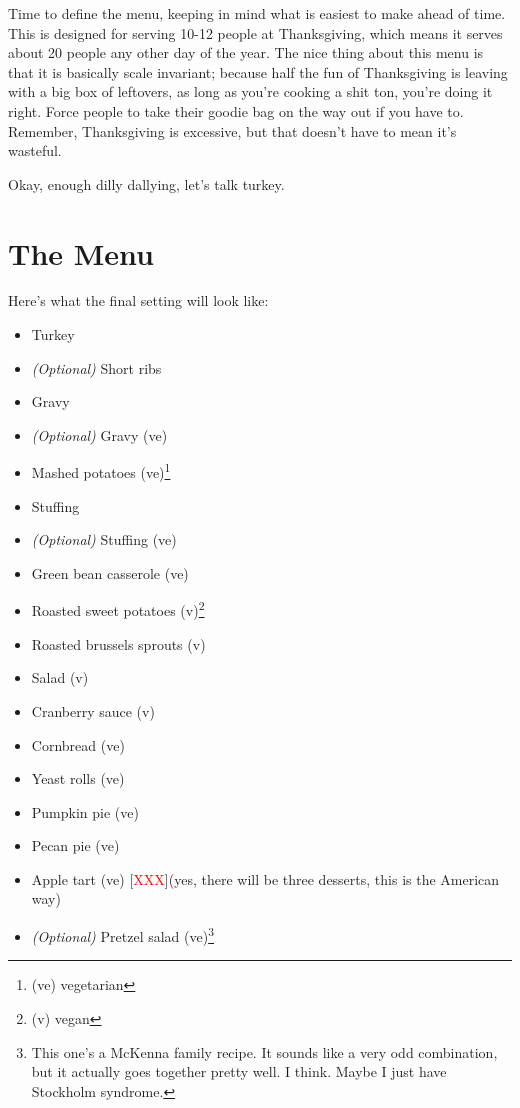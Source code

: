 \documentclass[12pt]{article}
\newcommand{\TODO}{[\textcolor{red}{XXX}]}
\begin{document}
	Time to define the menu, keeping in mind what is easiest to make ahead of time. This is designed for serving 10-12 people at Thanksgiving, which means it serves about 20 people any other day of the year. The nice thing about this menu is that it is basically scale invariant; because half the fun of Thanksgiving is leaving with a big box of leftovers, as long as you're cooking a shit ton, you're doing it right. Force people to take their goodie bag on the way out if you have to. Remember, Thanksgiving is excessive, but that doesn't have to mean it's wasteful.
	
	Okay, enough dilly dallying, let's talk turkey.
	
	\newpage
	
	\section{The Menu}
	Here's what the final setting will look like:
	\begin{itemize}
		\item Turkey
		\item \textit{(Optional)} Short ribs
		\item Gravy
		\item \textit{(Optional)} Gravy (ve)
		\item Mashed potatoes (ve)\footnote{(ve) vegetarian}
		\item Stuffing
		\item \textit{(Optional)} Stuffing (ve)
		\item Green bean casserole (ve)
		\item Roasted sweet potatoes (v)\footnote{(v) vegan}
		\item Roasted brussels sprouts (v)
		\item Salad (v)
		\item Cranberry sauce (v)
		\item Cornbread (ve)
		\item Yeast rolls (ve)
		\item Pumpkin pie (ve)
		\item Pecan pie (ve)
		\item Apple tart (ve) \TODO (yes, there will be three desserts, this is the American way)
		\item \textit{(Optional)} Pretzel salad (ve)\footnote{This one's a McKenna family recipe. It sounds like a very odd combination, but it actually goes together pretty well. I think. Maybe I just have Stockholm syndrome.}
	\end{itemize}
	
\end{document}
